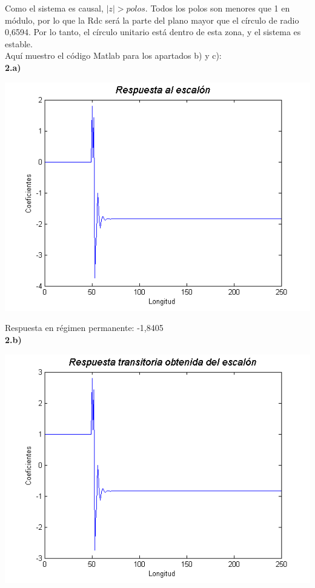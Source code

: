 \documentclass[a4paper,12pt]{article}
\begin{document}
Como el sistema es causal, $|z| > polos$. Todos los polos son menores que 1 en módulo, por lo que la Rdc será la parte del plano mayor que el círculo de radio 0,6594. Por lo tanto, el círculo unitario está dentro de esta zona, y el sistema es estable. \\

Aquí muestro el código Matlab para los apartados b) y c):\\



\textbf{2.a)}\\

\begin{center}
\includegraphics[width=.8 \textwidth]{ejercicio-4-2-a.png}
\end{center}

Respuesta en régimen permanente: -1,8405 \\



\textbf{2.b)}\\

\begin{center}
\includegraphics[width=.8 \textwidth]{ejercicio-4-2-b.png}
\end{center}
\end{document}
